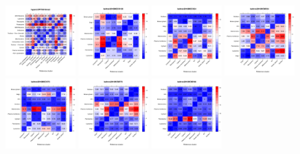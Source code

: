 \documentclass[12pt]{article}\usepackage[]{graphicx}\usepackage[]{color}
\begin{document}
\begin{figure}[p]
  \includegraphics[width = 0.24\textwidth]{./figure/allhmaps-6.pdf}
  \includegraphics[width = 0.24\textwidth]{./figure/allhmaps-7.pdf}
  \includegraphics[width = 0.24\textwidth]{./figure/allhmaps-8.pdf}
  \includegraphics[width = 0.24\textwidth]{./figure/allhmaps-9.pdf}
  \includegraphics[width = 0.24\textwidth]{./figure/allhmaps-10.pdf}
  \includegraphics[width = 0.24\textwidth]{./figure/allhmaps-11.pdf}
  \includegraphics[width = 0.24\textwidth]{./figure/allhmaps-12.pdf}

\end{figure}
\end{document}
